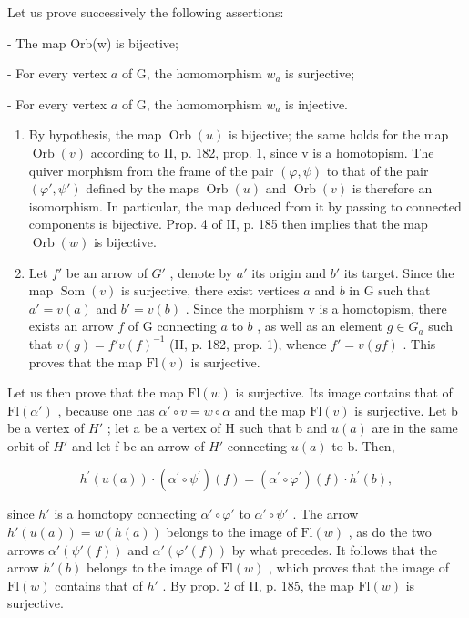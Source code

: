 Let us prove successively the following assertions:

- The map Orb(w) is bijective;

- For every vertex \(a\) of G, the homomorphism \(w_{a}\) is surjective;

- For every vertex \(a\) of G, the homomorphism \(w_{a}\) is injective.

\begin{enumerate}
\def\labelenumi{\alph{enumi})}
\item
  By hypothesis, the map \(\operatorname{Orb}(u)\) is bijective; the same holds for the map \(\operatorname{Orb}(v)\) according to II, p. 182, prop. 1, since v is a homotopism. The quiver morphism from the frame of the pair \((\varphi,\psi)\) to that of the pair \((\varphi',\psi')\) defined by the maps \(\operatorname{Orb}(u)\) and \(\operatorname{Orb}(v)\) is therefore an isomorphism. In particular, the map deduced from it by passing to connected components is bijective. Prop. 4 of II, p. 185 then implies that the map \(\operatorname{Orb}(w)\) is bijective.
\item
Let \(f'\) be an arrow of \(G'\) , denote by \(a'\) its origin and \(b'\) its target. Since the map \(\operatorname{Som}(v)\) is surjective, there exist vertices \(a\) and \(b\) in G such that \(a' = v(a)\) and \(b' = v(b)\) . Since the morphism v is a homotopism, there exists an arrow \(f\) of G connecting \(a\) to \(b\) , as well as an element \(g \in G_{a}\) such that \(v(g) = f'v(f)^{-1}\) (II, p. 182, prop. 1), whence \(f' = v(gf)\) . This proves that the map \(\mathrm{Fl}(v)\) is surjective.
\end{enumerate}

Let us then prove that the map \(\mathrm{Fl}(w)\) is surjective. Its image contains that of \(\mathrm{Fl}(\alpha')\) , because one has \(\alpha'\circ v=w\circ\alpha\) and the map \(\mathrm{Fl}(v)\) is surjective. Let b be a vertex of \(H'\) ; let a be a vertex of H such that b and \(u(a)\) are in the same orbit of \(H'\) and let f be an arrow of \(H'\) connecting \(u(a)\) to b. Then,

\[
h ^ {\prime} (u (a)) \cdot (\alpha^ {\prime} \circ \psi^ {\prime}) (f) = (\alpha^ {\prime} \circ \varphi^ {\prime}) (f) \cdot h ^ {\prime} (b),
\]

since \(h'\) is a homotopy connecting \(\alpha' \circ \varphi'\) to \(\alpha' \circ \psi'\) . The arrow \(h'(u(a)) = w(h(a))\) belongs to the image of \(\mathrm{Fl}(w)\) , as do the two arrows \(\alpha'(\psi'(f))\) and \(\alpha'(\varphi'(f))\) by what precedes. It follows that the arrow \(h'(b)\) belongs to the image of \(\mathrm{Fl}(w)\) , which proves that the image of \(\mathrm{Fl}(w)\) contains that of \(h'\) . By prop. 2 of II, p. 185, the map \(\mathrm{Fl}(w)\) is surjective.


